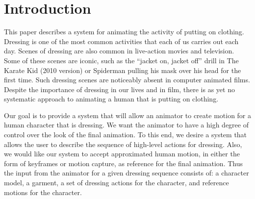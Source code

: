 \section{Introduction}


This paper describes a system for animating the activity of putting on
clothing.  Dressing is one of the most common activities that each of us
carries out each day.  Scenes of dressing are also common in live-action
movies and television.  Some of these scenes are iconic, such as the
``jacket on, jacket off'' drill in The Karate Kid (2010 version) or
Spiderman pulling his mask over his head for the first time.  Such
dressing scenes are noticeably absent in computer animated films.  Despite
the importance of dressing in our lives and in film, there is as yet no
systematic approach to animating a human that is putting on clothing.

%

Our goal is to provide a system that will allow an animator to create
motion for a human character that is dressing.  We want the animator to
have a high degree of control over the look of the final animation.  To
this end, we desire a system that allows the user to describe the sequence
of high-level actions for dressing.  Also, we would like our system to
accept approximated human motion, in either the form of  keyframes or
motion capture, as reference for the final animation.  Thus the input from
the animator for a given dressing sequence consists of: a character model,
a garment, a set of dressing actions for the character, and reference
motions for the character.  

